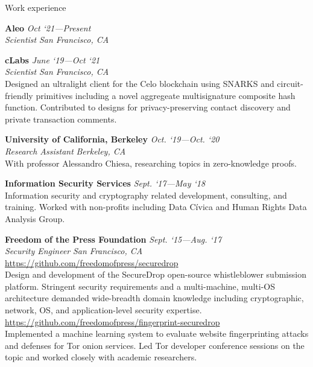 \documentclass{cv}
\begin{document}

\pagebreak
\begin{rSection}{Work experience}

\textbf{Aleo} \hfill \emph{Oct `21---Present} \\
\emph{Scientist} \hfill \emph{San Francisco, CA}

\textbf{cLabs} \hfill \emph{June `19---Oct `21} \\
\emph{Scientist} \hfill \emph{San Francisco, CA} \\
{\small Designed an ultralight client for the Celo blockchain using SNARKS and circuit-friendly primitives including a novel aggregeate multisignature composite hash function. Contributed to designs for privacy-preserving contact discovery and private transaction comments.}

\textbf{University of California, Berkeley} \hfill \emph{Oct. `19---Oct. `20} \\
\emph{Research Assistant} \hfill \emph{Berkeley, CA} \\
{\small With professor Alessandro Chiesa, researching topics in zero-knowledge proofs.}


\textbf{Information Security Services} \hfill \emph{Sept. `17---May `18} \\
{\small Information security and cryptography related development, consulting, and training. Worked with non-profits including Data Cívica and Human Rights Data Analysis Group.}

\textbf{Freedom of the Press Foundation} \hfill \emph{Sept. `15---Aug. `17} \\
\emph{Security Engineer} \hfill \emph{San Francisco, CA} \\
\url{https://github.com/freedomofpress/securedrop} \\
{\small Design and development of the SecureDrop open-source whistleblower submission platform. Stringent security requirements and a multi-machine, multi-OS architecture demanded wide-breadth domain knowledge including cryptographic, network, OS, and application-level security expertise.} \\
\url{https://github.com/freedomofpress/fingerprint-securedrop} \\
{\small Implemented a machine learning system to evaluate website fingerprinting attacks and defenses for Tor onion services. Led Tor developer conference sessions on the topic and worked closely with academic researchers.}

\end{rSection}
\end{document}
